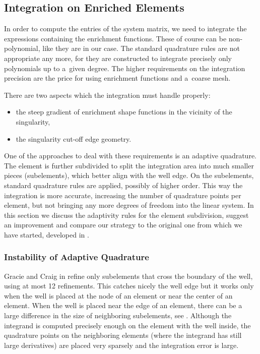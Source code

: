 \subsection{Integration on Enriched Elements}
\label{sec:integration}
In order to compute the entries of the system matrix, %
we need to integrate
the expressions containing the enrichment functions. These of course can be non-polynomial, like they are 
in our case. The standard quadrature rules are not appropriate any more, for they are constructed to integrate 
precisely only polynomials up to a~given degree. The higher requirements on the integration precision
are the price for using enrichment functions and a~coarse mesh.

There are two aspects which the integration must handle properly:
\begin{itemize}
  \item the steep gradient of enrichment shape functions in the vicinity of the singularity,
  \item the singularity cut-off edge geometry.
\end{itemize}

One of the approaches to deal with these requirements is an adaptive quadrature. The element is further subdivided 
to split the integration area into much smaller pieces (subelements), which better align with the well edge.
On the subelements, standard quadrature rules are applied, possibly of higher order.
This way the integration is more accurate, increasing the number of quadrature points per element, but not bringing
any more degrees of freedom into the linear system. In this section we discuss the adaptivity rules for the element subdivision, 
suggest an improvement and compare our strategy to the original one from which we have started, developed in \cite{gracie_modelling_2010}.

\subsubsection{Instability of Adaptive Quadrature}
\label{sec:refinement_element}
Gracie and Craig in \cite{gracie_modelling_2010} refine only subelements that cross the boundary of the well, using at most 12 refinements.
This catches nicely the well edge but it works only when the well is placed at the node of an element or near the center of an element. 
When the well is placed near the edge of an element, there can be
a large difference in the size of neighboring subelements, see . Although
the integrand is computed precisely enough on the element with the well inside, the quadrature points on the
neighboring elements (where the integrand has still large derivatives) are placed very sparsely 
and the integration error is large.

